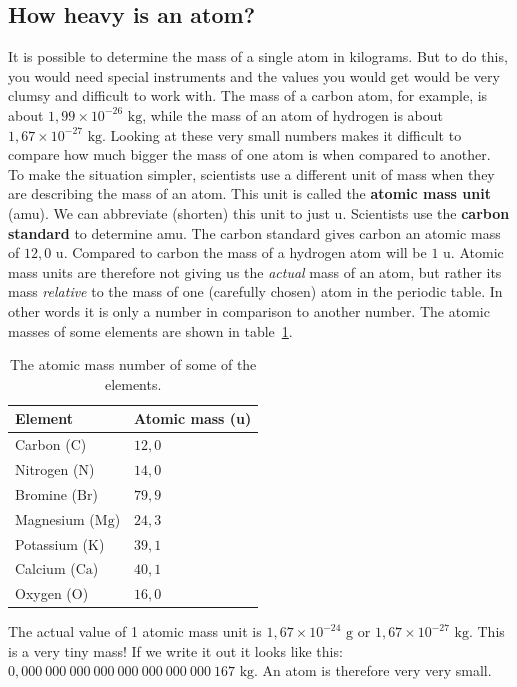             \subsection*{How heavy is an atom?}
            \nopagebreak
        \label{m38756*id254863}It is possible to determine the mass of a single atom in kilograms. But to do this, you would need special instruments and the values you would get would be very clumsy and difficult to work with. The mass of a carbon atom, for example, is about $1,99 \times {10}^{-26}\text{ kg}$, while the mass of an atom of hydrogen is about $1,67 \times{10}^{-27}\text{ kg}$. Looking at these very small numbers makes it difficult to compare how much bigger the mass of one atom is when compared to another.\\ 
        \label{m38756*id254908}To make the situation simpler, scientists use a different unit of mass when they are describing the mass of an atom. This unit is called the \textbf{atomic mass unit} (amu). We can abbreviate (shorten) this unit to just u. Scientists use the \textbf{carbon standard} to determine amu. The carbon standard gives carbon an atomic mass of $12,0 \text{ u}$. Compared to carbon the mass of a hydrogen atom will be $1 \text{ u}$. Atomic mass units are therefore not giving us the \textsl{actual} mass of an atom, but rather its mass \textsl{relative} to the mass of one (carefully chosen) atom in the periodic table. In other words it is only a number in comparison to another number. The atomic masses of some elements are shown in table~\ref{tab:atomic mass}.

          \begin{table}[H]
        \begin{center}
      \label{m38756*uid8}
    \noindent
      \begin{tabular}{|l|l|}\hline
\textbf{Element} & \textbf{Atomic mass (u)} \\ \hline
Carbon ($\text{C}$) & $12,0$ \\ \hline
Nitrogen ($\text{N}$) & $14,0$ \\ \hline
Bromine ($\text{Br}$) & $79,9$ \\ \hline
Magnesium ($\text{Mg}$) & $24,3$ \\ \hline
Potassium ($\text{K}$) & $39,1$ \\ \hline
Calcium ($\text{Ca}$) & $40,1$ \\ \hline
Oxygen ($\text{O}$) & $16,0$ \\ \hline
    \end{tabular}
      \end{center}
    \caption{The atomic mass number of some of the elements.}
\label{tab:atomic mass}
\end{table}
        \label{m38756*id255096}The actual value of 1 atomic mass unit is $1,67 \times {10}^{-24} \text{ g}$ or $1,67 \times {10}^{-27} \text{ kg}$. This is a very tiny mass! If we write it out it looks like this: $0,000~000~000~000~000~000~000~000~167\text{ kg}$. An atom is therefore very very small. 

